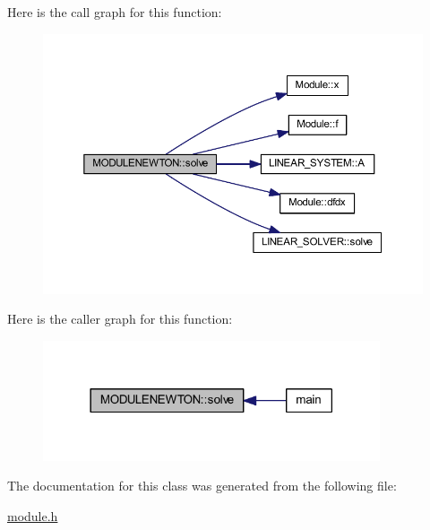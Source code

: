 Here is the call graph for this function\+:
\nopagebreak
\begin{figure}[H]
\begin{center}
\leavevmode
\includegraphics[width=350pt]{class_m_o_d_u_l_e_n_e_w_t_o_n_a8c3da4880abb18ae9e99854c21335e20_cgraph}
\end{center}
\end{figure}
Here is the caller graph for this function\+:
\nopagebreak
\begin{figure}[H]
\begin{center}
\leavevmode
\includegraphics[width=282pt]{class_m_o_d_u_l_e_n_e_w_t_o_n_a8c3da4880abb18ae9e99854c21335e20_icgraph}
\end{center}
\end{figure}


The documentation for this class was generated from the following file\+:\begin{DoxyCompactItemize}
\item 
\mbox{\hyperlink{module_8h}{module.\+h}}\end{DoxyCompactItemize}
